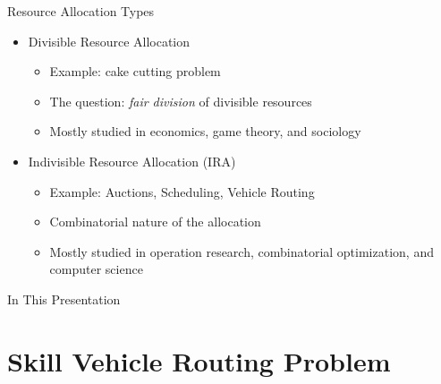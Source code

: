 \begin{frame}[t]{Resource Allocation Types}
    \begin{itemize}
        \item<2-> Divisible Resource Allocation
            \begin{itemize}
                \item<3-> Example: cake cutting problem
            	\item<4-> The question: \emph{fair division} of divisible resources
            	\item<5-> Mostly studied in  economics, game theory, and sociology
            \end{itemize}
        \item<6-> Indivisible Resource Allocation (\alert{IRA})
            \begin{itemize}
                \item<7-> Example: Auctions, Scheduling, Vehicle Routing
                \item<8-> Combinatorial nature of the allocation
                \item<9-> Mostly studied in operation research, combinatorial optimization, and computer science
            \end{itemize}  
    \end{itemize}
\end{frame}

\begin{frame}{In This Presentation}
  \tableofcontents
\end{frame}

\section{Skill Vehicle Routing Problem}
\frame{\textbf{\insertsection}}

